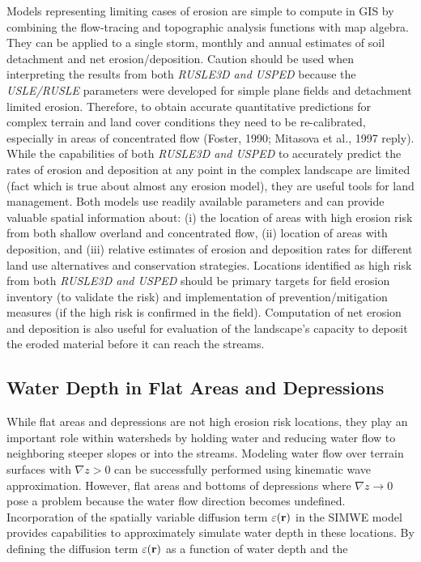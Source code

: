 \documentclass{kapedbk} %
\begin{document}
Models representing limiting cases of erosion are simple to compute
in GIS by combining the flow-tracing and topographic analysis functions with
map algebra. They can be applied to a single storm, monthly
and annual estimates of soil detachment and net erosion/deposition.
 Caution should be used when interpreting the results from both 
{\sl RUSLE3D and USPED} because the {\sl USLE/RUSLE}
parameters were developed for simple plane fields and detachment limited
erosion. Therefore, to obtain accurate quantitative predictions for
complex terrain and land cover conditions
they need to be re-calibrated, especially in areas of concentrated flow
 (Foster, 1990; Mitasova et al., 1997 reply).
While the capabilities of both {\sl RUSLE3D and USPED}
to accurately predict the rates of
erosion and deposition at any point in the complex landscape are limited (fact
which is true about almost any erosion model),
they are useful tools for land management.
Both models use readily available parameters and
can provide valuable spatial information about: (i) the location of areas
with high erosion risk from both shallow overland and concentrated flow,
(ii) location of areas with deposition, and
(iii) relative estimates of erosion and deposition rates
for different land use alternatives and conservation strategies.
Locations identified as high risk from both {\sl RUSLE3D and USPED}
should be primary targets for field erosion inventory
(to validate the risk) and implementation of prevention/mitigation measures
(if the high risk is confirmed in the field). Computation of net erosion
and deposition is also useful for evaluation of the landscape's capacity
to deposit the eroded material before it can reach the streams.

\bigskip \medskip \noindent 
\subsection{Water Depth in Flat Areas and Depressions}

\medskip
While flat areas and depressions are not high erosion risk locations,
they play an important role within watersheds by holding water
and reducing water flow to neighboring steeper slopes or into the streams.
Modeling water flow over terrain surfaces with $\nabla z>0$ can be
successfully performed using kinematic wave approximation. However,
flat areas and bottoms of depressions where $\nabla z \to 0$
pose a problem because the water flow direction becomes undefined.
Incorporation of the spatially variable diffusion term $\varepsilon({\bf r})$
in the SIMWE model provides capabilities to approximately simulate water depth
in these locations. By defining the diffusion term $\varepsilon({\bf r})$
as a function of water depth and the 
\end{document}
